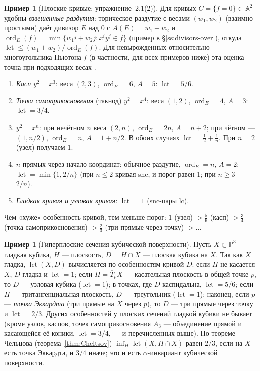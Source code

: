 \documentclass[11pt,a4paper]{article}
\theoremstyle{plain}
\theoremstyle{definition}
\newtheorem{example}[theorem]{Пример}
\theoremstyle{remark}
\newcommand{\PP}{\mathbb{P}}
\newcommand{\A}{\mathbb{A}}
\DeclareMathOperator{\ord}{ord}
\DeclareMathOperator{\lct}{lct}
\begin{document}
\begin{example}[Плоские кривые; упражнение~2.1(2)]\label{ex:lct-curves}
Для кривых $C=\{f=0\}\subset\A^2$ удобны \emph{взвешенные раздутия}: торическое раздутие с весами
$(w_1,w_2)$ (взаимно простыми) даёт дивизор $E$ над $0$ с $A(E)=w_1+w_2$ и
$\ord_E(f)=\min\{w_1i+w_2j: x^iy^j\in f\}$ (пример в \S\ref{ss:divisors-over}), откуда
$\lct\le(w_1+w_2)/\ord_E(f)$. Для невырожденных относительно многоугольника Ньютона $f$ (в
частности, для всех примеров ниже) эта оценка точна при подходящих весах \cite[\S\,8.3]{KolSing}.
\begin{enumerate}
\item \emph{Касп} $y^2=x^3$: веса $(2,3)$, $\ord_E=6$, $A=5$: $\lct=5/6$.
\item \emph{Точка самоприкосновения} (такнод) $y^2=x^4$: веса $(1,2)$, $\ord_E=4$, $A=3$: $\lct=3/4$.
\item $y^2=x^n$: при нечётном $n$ веса $(2,n)$, $\ord_E=2n$, $A=n+2$; при чётном --- $(1,n/2)$,
$\ord_E=n$, $A=1+n/2$. В обоих случаях $\lct=\frac12+\frac1n$. При $n=2$ (узел) получаем $1$.
\item $n$ прямых через начало координат: обычное раздутие, $\ord_E=n$, $A=2$: $\lct=\min\{1,2/n\}$
(при $n\le2$ кривая snc, и порог равен 1; при $n\ge3$ --- $2/n$).
\item \emph{Гладкая кривая и узловая кривая}: $\lct=1$ (snc-пары lc).
\end{enumerate}
Чем «хуже» особенность кривой, тем меньше порог: $1$ (узел) $>\frac56$ (касп) $>\frac34$ (точка самоприкосновения)
$>\frac23$ (три прямые через точку) $>\dots$
\end{example}

\begin{example}[Гиперплоские сечения кубической поверхности]\label{ex:lct-cubic-sections}
Пусть $X\subset\PP^3$ --- гладкая кубика, $H$ --- плоскость, $D=H\cap X$ --- плоская кубика на
$X$. Так как $X$ гладка, $\lct(X,D)$ вычисляется по особенностям кривой $D$: если $H$ не касается
$X$, $D$ гладка и $\lct=1$; если $H=\overline T_pX$ --- касательная плоскость в общей точке $p$, то
$D$ --- узловая кубика ($\lct=1$); в точках, где $D$ каспидальна, $\lct=5/6$; если $H$ ---
тритангенциальная плоскость, $D$ --- треугольник ($\lct=1$); наконец, если $p$ --- \emph{точка
Эккардта} (три прямые на $X$ через $p$), то $D$ --- три прямые через точку и $\lct=2/3$. Других особенностей у плоских сечений гладкой кубики не бывает (кроме узлов,
каспов, точек самоприкосновения $A_3$ --- объединение прямой и касающейся её коники, $\lct=3/4$, --- и перечисленных выше). По
теореме Чельцова (теорема~\ref{thm:Cheltsov}) $\inf_H\lct(X,H\cap X)$ равен $2/3$, если на $X$ есть
точка Эккардта, и $3/4$ иначе; это и есть $\alpha$-инвариант кубической поверхности.
\end{example}
\end{document}
